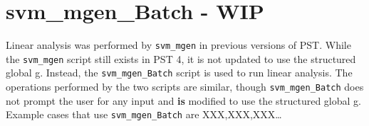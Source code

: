 \pagebreak
\section{svm\_mgen\_Batch - WIP}

Linear analysis was performed by \verb|svm_mgen| in previous versions of PST.
While the \verb|svm_mgen| script still exists in PST 4, it is not updated to use the structured global g.
Instead, the \verb|svm_mgen_Batch| script is used to run linear analysis.
The operations performed by the two scripts are similar, though \verb|svm_mgen_Batch| does not prompt the user for any input and \textbf{is} modified to use the structured global g.
Example cases that use \verb|svm_mgen_Batch| are XXX,XXX,XXX\ldots
